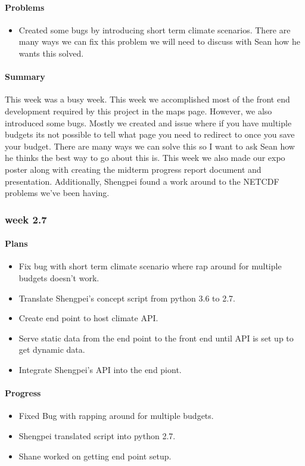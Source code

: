 \documentclass[onecolumn, draftclsnofoot,10pt, compsoc]{article}
\begin{document}
			\paragraph{Problems} \hfill \break
				\begin{itemize}
					\item Created some bugs by introducing short term climate scenarios.
						\subitem There are many ways we can fix this problem we will need to discuss with Sean how he wants this solved.
				\end{itemize}
			\paragraph{Summary} \hfill \break
			This week was a busy week. This week we accomplished most of the front end development required by this project in the maps page. However, we also introduced some bugs. Mostly we created and issue where if you have multiple budgets its not possible to tell what page you need to redirect to once you save your budget. There are many ways we can solve this so I want to ask Sean how he thinks the best way to go about this is. This week we also made our expo poster along with creating the midterm progress report document and presentation. Additionally, Shengpei found a work around to the NETCDF problems we've been having.\\
			
		\subsubsection{week 2.7}
			\paragraph{Plans} \hfill \break
				\begin{itemize}
					\item Fix bug with short term climate scenario where rap around for multiple budgets doesn't work.
					\item Translate Shengpei's concept script from python 3.6 to 2.7.
					\item Create end point to host climate API.
					\item Serve static data from the end point to the front end until API is set up to get dynamic data.
					\item Integrate Shengpei's API into the end piont.
				\end{itemize}
			\paragraph{Progress} \hfill \break
				\begin{itemize}
					\item Fixed Bug with rapping around for multiple budgets.
					\item Shengpei translated script into python 2.7.
					\item Shane worked on getting end point setup.
				\end{itemize}
\end{document}
